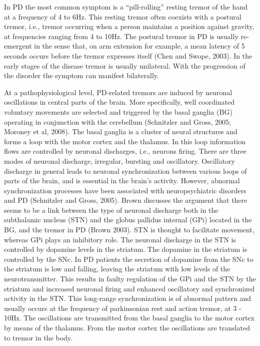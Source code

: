 
In \gls{PD} the most common symptom is a ``pill-rolling'' resting tremor of the hand at a frequency of 4 to 6Hz. This resting tremor often coexists with a postural tremor, i.e., tremor occurring when a person maintains a position against gravity, at frequencies ranging from 4 to 10Hz. The postural tremor in \gls{PD} is usually re-emergent in the sense that, on arm extension for example, a mean latency of 5 seconds occurs before the tremor expresses itself (Chen and Swope, 2003). In the early stages of the disease tremor is usually unilateral. With the progression of the disorder the symptom can manifest bilaterally.

At a pathophysiological level, \gls{PD}-related tremors are induced by neuronal oscillations in central parts of the brain. More specifically, well coordinated voluntary movements are selected and triggered by the basal ganglia (\gls{BG}) operating in conjunction with the cerebellum (Schnitzler and Gross, 2005; Moroney et al, 2008). The basal ganglia is a cluster of neural structures and forms a loop with the motor cortex and the thalamus. In this loop information flows are controlled by neuronal discharges, i.e., neurons firing. There are three modes of neuronal discharge, irregular, bursting and oscillatory. Oscillatory discharge in general leads to neuronal synchronization between various loops of parts of the brain, and is essential in the brain's activity. However, abnormal synchronization processes have been associated with neuropsychiatric disorders and \gls{PD} (Schnitzler and Gross, 2005). Brown discusses the argument that there seems to be a link between the type of neuronal discharge both in the subthalamic nucleus (\gls{STN}) and the globus pallidus internal (\gls{GPi}) located in the \gls{BG}, and the tremor in \gls{PD} (Brown 2003). STN is thought to facilitate movement, whereas GPi plays an inhibitory role. The neuronal discharge in the \gls{STN} is controlled by dopamine levels in the striatum. The dopamine in the striatum is controlled by the SNc. In \gls{PD} patients the secretion of dopamine from the \gls{SNc} to the striatum is low and falling, leaving the striatum with low levels of the neurotransmitter. This results in faulty regulation of the \gls{GPi} and the \gls{STN} by the striatum and increased neuronal firing and enhanced oscillatory and synchronized activity in the \gls{STN}. This long-range synchronization is of abnormal pattern and usually occurs at the frequency of parkinsonian rest and action tremor, at 3 - 10Hz. The oscillations are transmitted from the basal ganglia to the motor cortex by means of the thalamus. From the motor cortex the oscillations are translated to tremor in the body.
 
